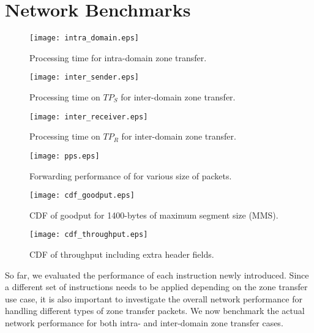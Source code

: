 \section{Network Benchmarks}
\label{sec:networkbenchmark}

\begin{figure}[htb]
	\begin{minipage}{.47\linewidth}
		\centering
		\texttt{[image: intra\_domain.eps]}
		\caption{Processing time for intra-domain zone transfer.}
		\label{fig:intra}
	\end{minipage}\hspace{1em}
	\begin{minipage}{.47\linewidth}
		\centering
		\texttt{[image: inter\_sender.eps]}
		\caption{Processing time on $TP_S$ for inter-domain zone transfer.}
		\label{fig:inter_sender}
	\end{minipage}\vspace{2em}
	\begin{minipage}{.47\linewidth}
		\centering
		\texttt{[image: inter\_receiver.eps]}
		\caption{Processing time on $TP_R$ for inter-domain zone transfer.}
		\label{fig:inter_receiver}
	\end{minipage}\hspace{1em}
	\begin{minipage}{.47\linewidth}
		\centering
		\texttt{[image: pps.eps]}
		\caption{Forwarding performance of \tp for various size of packets.}
		\label{fig:forwarding}
	\end{minipage}\vspace{2em}
	\begin{minipage}{.47\linewidth}
		\centering
		\texttt{[image: cdf\_goodput.eps]}
		\caption{CDF of goodput for 1400-bytes of maximum segment size (MMS).}
		\label{fig:goodput}
	\end{minipage}\hspace{1em}
	\begin{minipage}{.47\linewidth}
		\centering
		\texttt{[image: cdf\_throughput.eps]}
		\caption{CDF of throughput including extra header fields.}
		\label{fig:throughput}
	\end{minipage}
\end{figure}

So far, we evaluated the performance of each instruction newly introduced. Since a different
set of instructions needs to be applied depending on the zone transfer use case, it is also
important to investigate the overall network performance for handling different types of zone
transfer packets. We now benchmark the actual network performance for both intra- and inter-domain
zone transfer cases.

